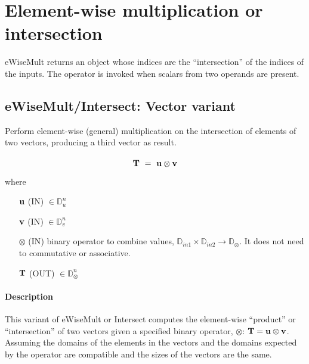 \section{Element-wise multiplication or intersection}

{\sf eWiseMult} returns an object whose indices are the ``intersection'' of 
the indices of the inputs. The operator is invoked when scalars from two 
operands are present.


\subsection{{\sf eWiseMult/Intersect}: Vector variant}

Perform element-wise (general) multiplication on the intersection of elements 
of two vectors, producing a third vector as result.

\paragraph{\syntax}

$$
{\bf T} ~ = ~ {\bf u} \otimes {\bf v}
$$

where

\begin{itemize}[leftmargin=1.1in]
    \item[${\bf u}$]    ({\sf IN}) $\in \mathbb{D}_{u}^{n}$

    \item[${\bf v}$]    ({\sf IN}) $\in \mathbb{D}_{v}^{n}$

    \item[$\otimes$]   ({\sf IN}) binary operator to combine values, $\mathbb{D}_{in1} \times \mathbb{D}_{in2} \rightarrow \mathbb{D}_\otimes$.  It does not need to commutative or associative.

    \item[${\bf T}$]    ({\sf OUT}) $\in \mathbb{D}_\otimes^{n}$

\end{itemize}

\paragraph{Description}

This variant of {\sf eWiseMult} or {\sf Intersect} computes the element-wise ``product'' or 
``intersection'' of two vectors given a specified binary operator, 
$\otimes$: ${\bf T} = {\bf u} \otimes {\bf v}$.  Assuming the domains of the
elements in the vectors and the domains expected by the operator are compatible
and the sizes of the vectors are the same.

